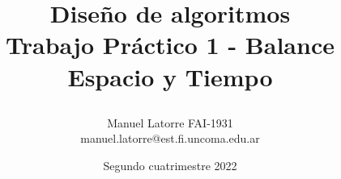 \titlepage

\title{\textbf{Diseño de algoritmos}\\
\large{\textbf{Trabajo Práctico 1 - Balance Espacio y Tiempo}}
\author{
Manuel Latorre FAI-1931\\ manuel.latorre@est.fi.uncoma.edu.ar\vspace{3mm}\\
}}
\date{Segundo cuatrimestre 2022}

\maketitle
\vspace{25mm}
\vfill
{}

\thispagestyle{empty}
\titlepage
\newpage
\tableofcontents %
\newpage
\pagestyle{plain}
\thispagestyle{plain}
\pagebreak